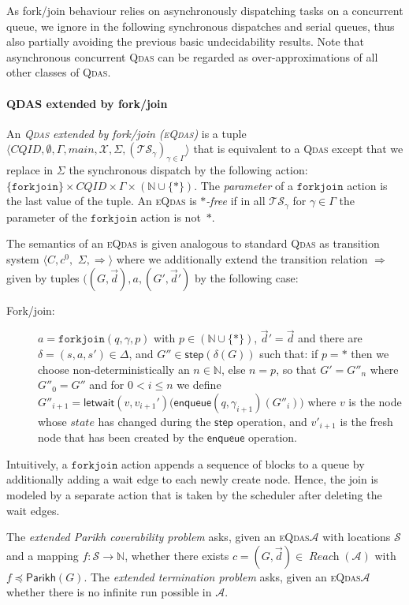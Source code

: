 \documentclass[runningheads,oribibl,]{article}
\newcommand{\mleq}{\preceq}
\newcommand{\Aa}{\ensuremath{\mathcal{A}}\xspace}
\newcommand{\Ss}{\ensuremath{\mathcal{S}}\xspace}
\newcommand{\Ts}{\ensuremath{\mathcal{TS}}\xspace}
\newcommand{\Xx}{\ensuremath{\mathcal{X}}\xspace}
\newcommand{\NN}{\ensuremath{\mathbb{N}}\xspace}
\newcommand{\cfont}[1]{\ensuremath{\mathtt{#1}}\xspace}
\newcommand{\CQID}{CQID\xspace}
\newcommand{\qdas}{\textsc{Qdas}\xspace}
\newcommand{\eqdas}{\textsc{eQdas}\xspace}
\DeclareMathOperator{\Reach}{\textit{Reach}}
\newcommand{\Graph}{\ensuremath{G}}
\newcommand{\Data}{\ensuremath{\vec{d}}}
\newcommand{\state}{\ensuremath{\textit{state}}}
\newcommand{\enqueue}{\ensuremath{\textsf{enqueue}}}
\newcommand{\step}{\ensuremath{\textsf{step}}}
\newcommand{\letwait}{\ensuremath{\textsf{letwait}}}
\newcommand{\forkjoin}{\ensuremath{\cfont{forkjoin}}\xspace}
\newcommand{\Parikh}{\ensuremath{\mathsf{Parikh}}}
\begin{document}
As fork/join behaviour relies on asynchronously dispatching tasks
on a concurrent queue, we ignore in the following
synchronous dispatches and serial queues, thus also partially
avoiding the
previous basic undecidability results. Note that asynchronous
concurrent \qdas can be regarded as over-approximations of all other
classes of \qdas.


\paragraph{\bf QDAS extended by fork/join}
An \emph{\qdas extended by fork/join (\eqdas)}
is a tuple $\langle \CQID, \emptyset,
  \Gamma, main, \Xx, \Sigma, (\Ts_\gamma)_{\gamma\in\Gamma}\rangle$
  that is equivalent to a \qdas except that we replace in $\Sigma$
  the synchronous dispatch by the following action:
  $\{\forkjoin\}\times \CQID\times \Gamma \times (\NN\cup\{\ast\})$.
  The \emph{parameter} of a \forkjoin action is the last value of the
  tuple.
  An \eqdas is \emph{$\ast$-free} if in all $\Ts_\gamma$ for
  $\gamma\in\Gamma$ the parameter of the \forkjoin action is
  not~$\ast$.

  The semantics of an \eqdas
  is given analogous to standard \qdas as
  transition system $\langle C, c^0,$ $ \Sigma, \Longrightarrow \rangle$
  where we additionally extend the transition relation
  $\Longrightarrow$ given by tuples
$\big((\Graph,\Data),a,(\Graph',\Data')$
by the following case:
\begin{description}
  \item[Fork/join:] $a=\forkjoin(q,\gamma,p)$ with
    $p\in(\NN\cup\{\ast\})$,
    $\Data'=\Data$ and there
  are $\delta=(s,a,s')\in \Delta$,  and
  $\Graph''\in\step(\delta(\Graph))$
  such that:
  if $p=\ast$ then we choose non-deterministically an $n\in\NN$, else
  $n=p$, so that
  $\Graph'=\Graph''_n$ where
  $\Graph''_0=\Graph''$ and for $0<i\leq n$ we define
  $\Graph''_{i+1}=\letwait(v,v_{i+1}')\big(\enqueue(q,\gamma_{i+1})(\Graph''_i)\big)$
  where $v$ is the node whose $\state$ has changed during the $\step$
  operation, and $v'_{i+1}$ is the fresh node that has been created by the
  $\enqueue$ operation.
\end{description}
Intuitively, a \forkjoin action appends a sequence of blocks to a
queue by additionally adding a wait edge to each newly create node.
Hence, the join is modeled by a separate action that is taken by the
scheduler after deleting the wait edges.

The \emph{extended Parikh
coverability problem} asks, given an \eqdas $\Aa$ with locations
$\Ss$ and a mapping $f:\Ss\rightarrow\NN$, whether
there exists $c=(\Graph,\Data)\in\Reach(\Aa)$ with
$f\mleq\Parikh(\Graph)$. The \emph{extended termination problem}
asks, given an \eqdas $\Aa$ whether
there is no infinite run possible in $\Aa$.
\end{document}
